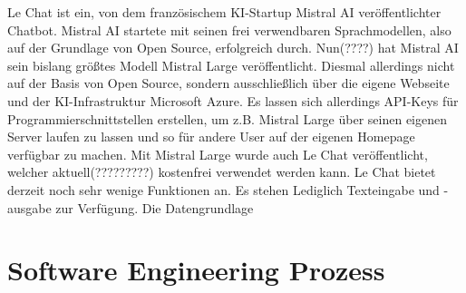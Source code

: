 Le Chat ist ein, von dem französischem KI-Startup Mistral AI veröffentlichter Chatbot. Mistral AI startete mit  
seinen frei verwendbaren Sprachmodellen, also auf der Grundlage von Open Source, erfolgreich durch. Nun(????)  
hat Mistral AI sein bislang größtes Modell Mistral Large veröffentlicht. Diesmal allerdings nicht auf der  
Basis von Open Source, sondern ausschließlich über die eigene Webseite und der KI-Infrastruktur Microsoft  
Azure. Es lassen sich allerdings API-Keys für Programmierschnittstellen erstellen, um z.B. Mistral Large über  
seinen eigenen Server laufen zu lassen und so für andere User auf der eigenen Homepage verfügbar zu machen.  
Mit Mistral Large wurde auch Le Chat veröffentlicht, welcher aktuell(?????????) kostenfrei verwendet werden kann.
Le Chat bietet derzeit noch sehr wenige Funktionen an. Es stehen Lediglich Texteingabe und -ausgabe zur Verfügung.  
Die Datengrundlage 
\section{Software Engineering Prozess}
